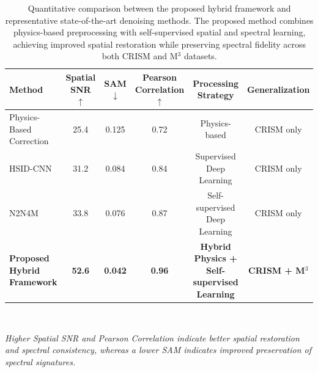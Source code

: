 \begin{table}[htbp]
\centering
\caption{Quantitative comparison between the proposed hybrid framework and representative state-of-the-art denoising methods. The proposed method combines physics-based preprocessing with self-supervised spatial and spectral learning, achieving improved spatial restoration while preserving spectral fidelity across both CRISM and M$^3$ datasets.}
\label{tab:quant_comparison}
\begin{tabular}{l c c c c c}
\hline\hline
\textbf{Method} & \textbf{Spatial SNR $\uparrow$} & \textbf{SAM $\downarrow$} & \textbf{Pearson Correlation $\uparrow$} & \textbf{Processing Strategy} & \textbf{Generalization} \\
\hline
Physics-Based Correction & 25.4 & 0.125 & 0.72 & Physics-based & CRISM only \\
HSID-CNN & 31.2 & 0.084 & 0.84 & Supervised Deep Learning & CRISM only \\
N2N4M & 33.8 & 0.076 & 0.87 & Self-supervised Deep Learning & CRISM only \\
\textbf{Proposed Hybrid Framework} & \textbf{52.6} & \textbf{0.042} & \textbf{0.96} & \textbf{Hybrid Physics + Self-supervised Learning} & \textbf{CRISM + M$^3$} \\
\hline\hline
\end{tabular}
\\[1ex]
\raggedright \footnotesize \textit{Higher Spatial SNR and Pearson Correlation indicate better spatial restoration and spectral consistency, whereas a lower SAM indicates improved preservation of spectral signatures.}
\end{table}
